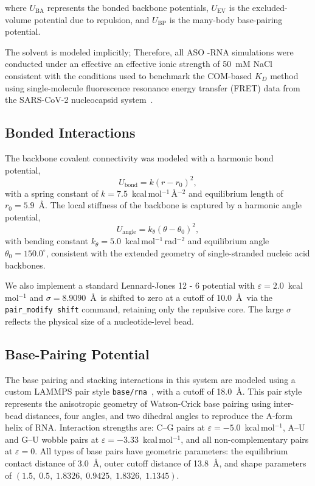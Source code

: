 where $U_{\mathrm{BA}}$ represents the bonded backbone potentials,
$U_{\mathrm{EV}}$ is the excluded-volume potential due to repulsion, and $U_{\mathrm{BP}}$
is the many-body base-pairing potential.


The solvent is modeled implicitly; Therefore, all ASO -RNA simulations were conducted under an effective an effective ionic strength of 50~mM NaCl consistent with the
conditions used to benchmark the COM-based $K_D$ method using single-molecule fluorescence resonance energy transfer (FRET) data from the SARS-CoV-2 nucleocapsid system~\cite{Alston2023}.






\subsection{Bonded Interactions}

The backbone covalent connectivity was modeled with a harmonic bond potential,
\begin{equation}
  U_{\mathrm{bond}} = k(r - r_0)^2,
\end{equation}
with a spring constant of $k = 7.5$~kcal\,mol$^{-1}$\,\AA$^{-2}$ and
equilibrium length of $r_0 = 5.9$~\AA.
The local stiffness of the backbone is captured by a harmonic angle potential,
\begin{equation}
  U_{\mathrm{angle}} = k_\theta(\theta - \theta_0)^2,
\end{equation}
with bending constant $k_\theta = 5.0$~kcal\,mol$^{-1}$\,rad$^{-2}$
and equilibrium angle $\theta_0 = 150.0^\circ$, consistent with the
extended geometry of single-stranded nucleic acid backbones.

We also implement a standard Lennard-Jones 12 - 6 potential
with $\varepsilon = 2.0$~kcal\,mol$^{-1}$ and $\sigma = 8.9090$~\AA\
is shifted to zero at a cutoff of 10.0~\AA\ via the
\texttt{pair\_modify shift} command, retaining only the repulsive core.
The large $\sigma$ reflects the physical size of a nucleotide-level bead.

\subsection{Base-Pairing Potential}

The base pairing and stacking interactions in this system are modeled using a custom LAMMPS pair style \texttt{base/rna}~\cite{Aierken2024}, with a cutoff of 18.0~\AA. This pair style represents the anisotropic geometry of Watson-Crick base pairing using inter-bead distances, four angles, and two dihedral angles to reproduce the A-form helix of RNA. Interaction strengths are: C--G pairs at $\varepsilon = -5.0$~kcal\,mol$^{-1}$,
A--U and G--U wobble pairs at $\varepsilon = -3.33$~kcal\,mol$^{-1}$,
and all non-complementary pairs at $\varepsilon = 0$.
All types of base pairs have geometric parameters: the equilibrium contact distance of
3.0~\AA, outer cutoff distance of 13.8~\AA, and shape parameters of
$(1.5,\;0.5,\;1.8326,\;0.9425,\;1.8326,\;1.1345)$.





